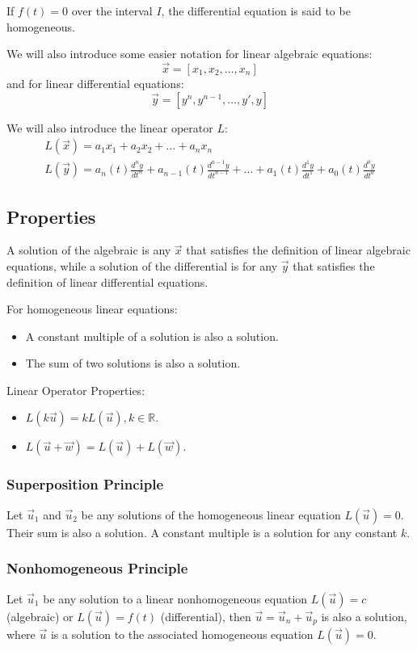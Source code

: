 If $f(t)=0$ over the interval $I$, the differential equation is said to be homogeneous.

We will also introduce some easier notation for linear algebraic equations:
\[
\vec{x} = [x_1, x_2, \dots, x_n]
\]
and for linear differential equations:
\[
\vec{y} = [y^n, y^{n-1}, \dots, y\prime, y]
\]

We will also introduce the linear operator $L$:
\[
\begin{aligned}
L(\vec{x}) = a_1x_1 + a_2x_2 + \dots + a_nx_n\\
L(\vec{y}) = a_n(t) \frac{d^ny}{dt^n} + a_{n-1}(t) \frac{d^{n-1}y}{dt^{n-1}} + \dots + a_1(t) \frac{d^1y}{dt^1} + a_0(t) \frac{d^0y}{dt^0}
\end{aligned}
\]

    \subsection{Properties}
    A solution of the algebraic is any $\vec{x}$ that satisfies the definition of linear algebraic equations, while a solution of the differential is for any $\vec{y}$ that satisfies the definition of linear differential equations.

    For homogeneous linear equations:
    \begin{itemize}
    \item A constant multiple of a solution is also a solution.
    \item The sum of two solutions is also a solution.
    \end{itemize}

    Linear Operator Properties:
    \begin{itemize}
    \item $L(k \vec{u}) = k L(\vec{u}), k \in \mathbb{R}$.
    \item $L(\vec{u} + \vec{w}) = L(\vec{u}) + L(\vec{w})$.
    \end{itemize}

    \subsubsection{Superposition Principle}
    Let $\vec{u}_1$ and $\vec{u}_2$ be any solutions of the homogeneous linear equation $L(\vec{u}) = 0$. Their sum is also a solution. A constant multiple is a solution for any constant $k$.

    \subsubsection{Nonhomogeneous Principle}
    Let $\vec{u}_1$ be any solution to a linear nonhomogeneous equation $L(\vec{u}) = c$ (algebraic) or $L(\vec{u}) = f(t)$ (differential), then $\vec{u} = \vec{u}_n + \vec{u}_p$ is also a solution, where $\vec{u}$ is a solution to the associated homogeneous equation $L(\vec{u}) = 0$.

